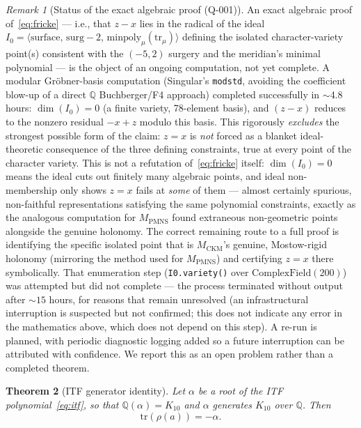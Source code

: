 \documentclass[11pt,a4paper]{article}
\newtheorem{theorem}{Theorem}
\theoremstyle{remark}
\newtheorem{remark}[theorem]{Remark}
\newcommand{\MCKM}{M_{\mathrm{CKM}}}
\newcommand{\MPMNS}{M_{\mathrm{PMNS}}}
\newcommand{\QQ}{\mathbb{Q}}
\newcommand{\Kten}{K_{10}}
\begin{document}
\begin{remark}[Status of the exact algebraic proof (Q-001)]
\label{rem:q001status}
An exact algebraic proof of~\eqref{eq:fricke} --- i.e., that $z - x$ lies
in the radical of the ideal $I_0 = \langle \mathrm{surface},\,
\mathrm{surg} - 2,\, \mathrm{minpoly}_\mu(\mathrm{tr}_\mu) \rangle$
defining the isolated character-variety point(s) consistent with the
$(-5,2)$ surgery and the meridian's minimal polynomial --- is the
object of an ongoing computation, not yet complete.
A modular Gr\"obner-basis computation (Singular's \texttt{modstd},
avoiding the coefficient blow-up of a direct $\QQ$ Buchberger/F4
approach) completed successfully in $\sim$4.8 hours: $\dim(I_0) = 0$
(a finite variety, 78-element basis), and $(z-x)$ reduces to the
nonzero residual $-x+z$ modulo this basis.
This rigorously \emph{excludes} the strongest possible form of the
claim: $z = x$ is \emph{not} forced as a blanket ideal-theoretic
consequence of the three defining constraints, true at every point of
the character variety.
This is not a refutation of~\eqref{eq:fricke} itself: $\dim(I_0) = 0$
means the ideal cuts out finitely many algebraic points, and ideal
non-membership only shows $z = x$ fails at \emph{some} of them ---
almost certainly spurious, non-faithful representations satisfying the
same polynomial constraints, exactly as the analogous computation for
$\MPMNS$ found extraneous non-geometric points alongside the genuine
holonomy. The correct remaining route to a full proof is identifying
the specific isolated point that is $\MCKM$'s genuine, Mostow-rigid
holonomy (mirroring the method used for $\MPMNS$) and certifying
$z = x$ there symbolically. That enumeration step (\texttt{I0.variety()}
over $\mathrm{ComplexField}(200)$) was attempted but did not complete ---
the process terminated without output after $\sim 15$ hours, for reasons
that remain unresolved (an infrastructural interruption is suspected but
not confirmed; this does not indicate any error in the mathematics above,
which does not depend on this step). A re-run is planned, with periodic
diagnostic logging added so a future interruption can be attributed with
confidence.
We report this as an open problem rather than a completed theorem.
\end{remark}

\begin{theorem}[ITF generator identity]
\label{thm:itf}
Let $\alpha$ be a root of the ITF polynomial~\eqref{eq:itf}, so that
$\QQ(\alpha) = \Kten$ and $\alpha$ generates $\Kten$ over $\QQ$.
Then
\begin{equation}
\mathrm{tr}(\rho(a)) = -\alpha.
\label{eq:tra}
\end{equation}
\end{theorem}
\end{document}
